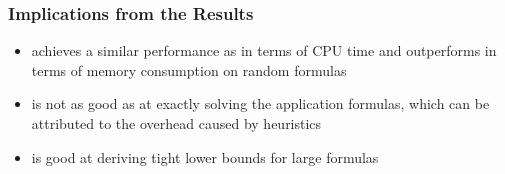 \begin{frame}
    \frametitle{Implications from the Results}
    \begin{itemize}
        \item \erssat achieves a similar performance as \dcssat in terms of CPU time and outperforms \dcssat in terms of memory consumption on random formulas
        \item \erssat is not as good as \dcssat at exactly solving the application formulas, which can be attributed to the overhead caused by heuristics
        \item \erssat is good at deriving tight lower bounds for large formulas
    \end{itemize}
\end{frame}